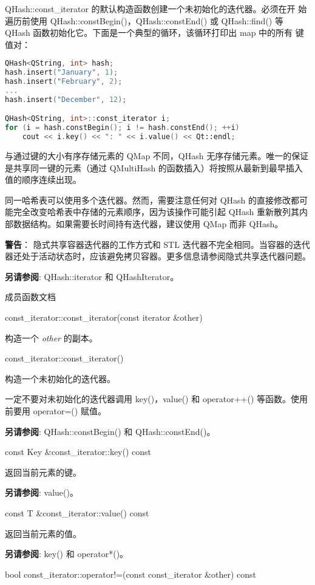 QHash::const\_iterator 的默认构造函数创建一个未初始化的迭代器。必须在开
始遍历前使用 QHash::constBegin()，QHash::constEnd() 或 QHash::find()
等 QHash 函数初始化它。下面是一个典型的循环，该循环打印出 map 中的所有
键值对：

\begin{lstlisting}[language=C++]
QHash<QString, int> hash;
hash.insert("January", 1);
hash.insert("February", 2);
...
hash.insert("December", 12);

QHash<QString, int>::const_iterator i;
for (i = hash.constBegin(); i != hash.constEnd(); ++i)
    cout << i.key() << ": " << i.value() << Qt::endl;
\end{lstlisting}

与通过键的大小有序存储元素的 QMap 不同，QHash 无序存储元素。唯一的保证是共享同一键的元素（通过 QMultiHash 的函数插入）将按照从最新到最早插入值的顺序连续出现。

同一哈希表可以使用多个迭代器。然而，需要注意任何对 QHash 的直接修改都可能完全改变哈希表中存储的元素顺序，因为该操作可能引起 QHash 重新散列其内部数据结构。如果需要长时间持有迭代器，建议使用 QMap 而非 QHash。

\textbf{警告}： 隐式共享容器迭代器的工作方式和 STL 迭代器不完全相同。当容器的迭代器还处于活动状态时，应该避免拷贝容器。更多信息请参阅隐式共享迭代器问题。

\textbf{另请参阅}: QHash::iterator 和 QHashIterator。


\splitLine

成员函数文档

const\_iterator::const\_iterator(const iterator \&other)

构造一个 \emph{other} 的副本。

const\_iterator::const\_iterator()

构造一个未初始化的迭代器。

一定不要对未初始化的迭代器调用 key()，value() 和 operator++() 等函数。使用前要用 operator=() 赋值。

\textbf{另请参阅}: QHash::constBegin() 和 QHash::constEnd()。

const Key \&const\_iterator::key() const

返回当前元素的键。

\textbf{另请参阅}: value()。

const T \&const\_iterator::value() const

返回当前元素的值。

\textbf{另请参阅}: key() 和 operator*()。

bool const\_iterator::operator!=(const const\_iterator \&other) const

